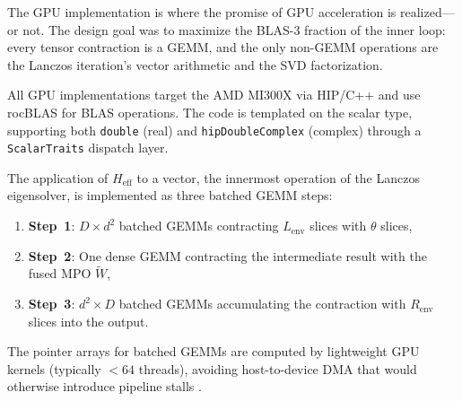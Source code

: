 \documentclass[preprint,12pt]{elsarticle}
\begin{document}
The GPU implementation is where the promise of GPU acceleration is realized---or not.
The design goal was to maximize the BLAS-3 fraction of the inner loop: every tensor contraction is a GEMM, and the only non-GEMM operations are the Lanczos iteration's vector arithmetic and the SVD factorization.

All GPU implementations target the AMD MI300X via HIP/C++ and use rocBLAS \cite{rocBLAS2024} for BLAS operations.
The code is templated on the scalar type, supporting both \texttt{double} (real) and \texttt{hipDoubleComplex} (complex) through a \texttt{ScalarTraits} dispatch layer.

The application of $H_\text{eff}$ to a vector, the innermost operation of the Lanczos eigensolver, is implemented as three batched GEMM steps:
\begin{enumerate}
  \item \textbf{Step~1}: $D \times d^2$ batched GEMMs contracting $L_\text{env}$ slices with $\theta$ slices,
  \item \textbf{Step~2}: One dense GEMM contracting the intermediate result with the fused MPO $\widetilde{W}$,
  \item \textbf{Step~3}: $d^2 \times D$ batched GEMMs accumulating the contraction with $R_\text{env}$ slices into the output.
\end{enumerate}
The pointer arrays for batched GEMMs are computed by lightweight GPU kernels (typically $< 64$ threads), avoiding host-to-device DMA that would otherwise introduce pipeline stalls \cite{ROCm2024}.
\end{document}
